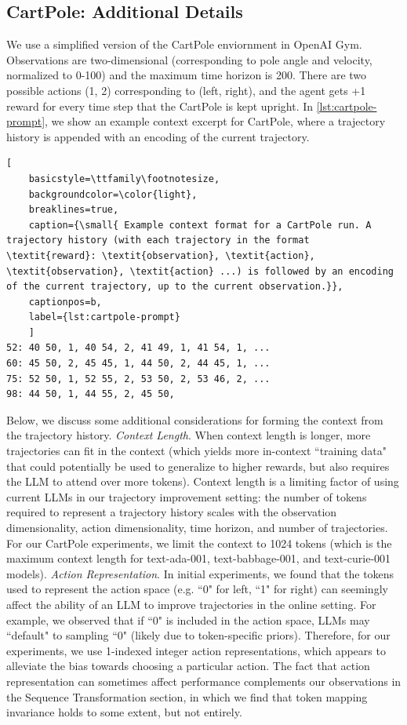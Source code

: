 \documentclass{article}
\begin{document}
\subsection{CartPole: Additional Details}
We use a simplified version of the CartPole enviornment in OpenAI Gym. Observations are two-dimensional (corresponding to pole angle and velocity, normalized to 0-100) and the maximum time horizon is 200. There are two possible actions (1, 2) corresponding to (left, right), and the agent gets +1 reward for every time step that the CartPole is kept upright. In \cref{lst:cartpole-prompt}, we show an example context excerpt for CartPole, where a trajectory history is appended with an encoding of the current trajectory.
\begin{lstlisting}[
    basicstyle=\ttfamily\footnotesize,
    backgroundcolor=\color{light},
    breaklines=true,
    caption={\small{ Example context format for a CartPole run. A trajectory history (with each trajectory in the format \textit{reward}: \textit{observation}, \textit{action}, \textit{observation}, \textit{action} ...) is followed by an encoding of the current trajectory, up to the current observation.}},
    captionpos=b,
    label={lst:cartpole-prompt}
    ]
52: 40 50, 1, 40 54, 2, 41 49, 1, 41 54, 1, ...
60: 45 50, 2, 45 45, 1, 44 50, 2, 44 45, 1, ...
75: 52 50, 1, 52 55, 2, 53 50, 2, 53 46, 2, ...
98: 44 50, 1, 44 55, 2, 45 50,
\end{lstlisting}
Below, we discuss some additional considerations for forming the context from the trajectory history.
\textit{Context Length}. When context length is longer, more trajectories can fit in the context (which yields more in-context ``training data" that could potentially be used to generalize to higher rewards, but also requires the LLM to attend over more tokens). Context length is a limiting factor of using current LLMs in our trajectory improvement setting: the number of tokens required to represent a trajectory history scales with the observation dimensionality, action dimensionality, time horizon, and number of trajectories. For our CartPole experiments, we limit the context to 1024 tokens (which is the maximum context length for text-ada-001, text-babbage-001, and text-curie-001 models).
\textit{Action Representation}. In initial experiments, we found that the tokens used to represent the action space (e.g. ``0" for left, ``1" for right) can seemingly affect the ability of an LLM to improve trajectories in the online setting. For example, we observed that if ``0" is included in the action space, LLMs may ``default" to sampling ``0" (likely due to token-specific priors). Therefore, for our experiments, we use 1-indexed integer action representations, which appears to alleviate the bias towards choosing a particular action. The fact that action representation can sometimes affect performance complements our observations in the Sequence Transformation section, in which we find that token mapping invariance holds to some extent, but not entirely.
\end{document}
